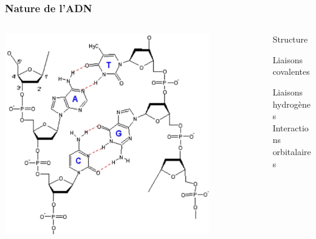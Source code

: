 \documentclass{beamer}
\begin{document}
 \frame %
{
  \frametitle{Nature de l'ADN}
  
  \begin{columns}
  \begin{column}{0.7\textwidth}
\begin{center}
\includegraphics[width=0.8\textwidth]{adn.jpg}
\end{center}
\end{column}

  \begin{column}{0.3\textwidth}
\begin{center}
Structure\\
\medskip

Liaisons covalentes\\
\medskip

Liaisons hydrogènes\\
\medskip
Interactions orbitalaires


\end{center}
\end{column}

\end{columns}

}
\end{document}
